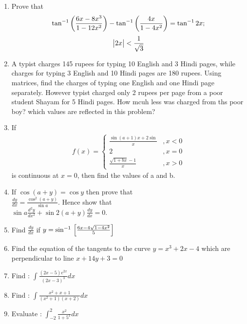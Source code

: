 \documentclass[journal,12pt,onecolumn]{IEEEtran}
\renewcommand\thesection{\arabic{section}}
\begin{document}
\begin{enumerate}[label=\thesection.\arabic*.,ref=\thesection.\theenumi]
\item Prove that 
	\begin{align}
	\tan^{-1} \left(\frac{6x-8x^{3}}{1-12x^{2}}\right) - \tan^{-1} \left(\frac{4x}{1-4x^{2}}\right) = \tan^{-1}2x;
	\end{align}
	\begin{align}
		\begin{vmatrix}2x\end{vmatrix} < \frac{1}{\sqrt{3}}
	\end{align}

\item A typist charges 145 rupees for typing 10 English and 3 Hindi pages, while charges for typing 3 English and 10 Hindi pages are 180 rupees. Using matrices, 
find the charges of typing one English and one Hindi page separately. 
However typist charged only 2 rupees per page from a poor student Shayam for 5 Hindi pages.
How mcuh less was charged from ths poor boy? which values are reflected in this problem?

\item If 
	\begin{align}
		f(x) = 
		\begin{cases}
			\frac{\sin(a+1)x + 2\sin}{x} &,x<0 \\
			2 &,x = 0\\
			\frac{\sqrt{1+bx}-1}{x} &,x>0
		\end{cases}
	\end{align}
is continuous at $x = 0$, then find the values of a and b.

\item If $\cos(a+y) = \cos y$ then prove that \\
$\frac{dy}{dx} = \frac{\cos^{2}(a+y)}{\sin a}$. 
Hence show that \\
$\sin a \frac{d^{2}y}{dx^{2}} + \sin 2(a+y)\frac{dy}{dx} = 0 $.

\item Find $\frac{dy}{dx}$ if $y = \sin^{-1}{}\left[\frac{6x - 4\sqrt{1-4x^2}}{5}\right]$ 

\item Find the equation of the tangents to the curve $y = x^3 + 2x - 4$ which are perpendicular to line $x + 14y + 3 = 0$

\item Find : $\int \frac{(2x-5)e^{2x}}{(2x-3)^3} dx$

\item Find : $\int \frac{x^2 +x +1}{(x^2 + 1)(x + 2)} dx$

\item Evaluate : $\int_{-2}^{2} \frac{x^2}{1+5^x} dx$


\end{enumerate}
\end{document}
